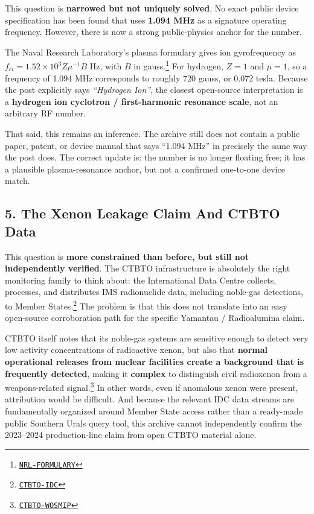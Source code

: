 \documentclass[11pt]{article}
\newcommand{\src}[2]{\href{#1}{\texttt{#2}}}
\begin{document}
This question is \textbf{narrowed but not uniquely solved}. No exact public device specification has been found that uses \textbf{1.094 MHz} as a signature operating frequency. However, there is now a strong public-physics anchor for the number.

The Naval Research Laboratory's plasma formulary gives ion gyrofrequency as \(f_{ci} = 1.52 \times 10^3 Z \mu^{-1} B\) Hz, with \(B\) in gauss.\footnote{\src{https://www.nrl.navy.mil/Portals/38/PDF\%20Files/NRL_Plasma_Formulary_2019.pdf}{NRL-FORMULARY}} For hydrogen, \(Z=1\) and \(\mu=1\), so a frequency of 1.094 MHz corresponds to roughly \(720\) gauss, or \(0.072\) tesla. Because the post explicitly says \emph{``Hydrogen Ion''}, the closest open-source interpretation is a \textbf{hydrogen ion cyclotron / first-harmonic resonance scale}, not an arbitrary RF number.

That said, this remains an inference. The archive still does not contain a public paper, patent, or device manual that says ``1.094 MHz'' in precisely the same way the post does. The correct update is: the number is no longer floating free; it has a plausible plasma-resonance anchor, but not a confirmed one-to-one device match.

\subsection{5. The Xenon Leakage Claim And CTBTO Data}

This question is \textbf{more constrained than before, but still not independently verified}. The CTBTO infrastructure is absolutely the right monitoring family to think about: the International Data Centre collects, processes, and distributes IMS radionuclide data, including noble-gas detections, to Member States.\footnote{\src{https://www.ctbto.org/our-work/international-data-centre}{CTBTO-IDC}} The problem is that this does not translate into an easy open-source corroboration path for the specific Yamantau / Radioalumina claim.

CTBTO itself notes that its noble-gas systems are sensitive enough to detect very low activity concentrations of radioactive xenon, but also that \textbf{normal operational releases from nuclear facilities create a background that is frequently detected}, making it \textbf{complex} to distinguish civil radioxenon from a weapons-related signal.\footnote{\src{https://www.ctbto.org/news-and-events/news/workshop-signatures-man-made-isotope-production-wosmip-vi}{CTBTO-WOSMIP}} In other words, even if anomalous xenon were present, attribution would be difficult. And because the relevant IDC data streams are fundamentally organized around Member State access rather than a ready-made public Southern Urals query tool, this archive cannot independently confirm the 2023--2024 production-line claim from open CTBTO material alone.
\end{document}
